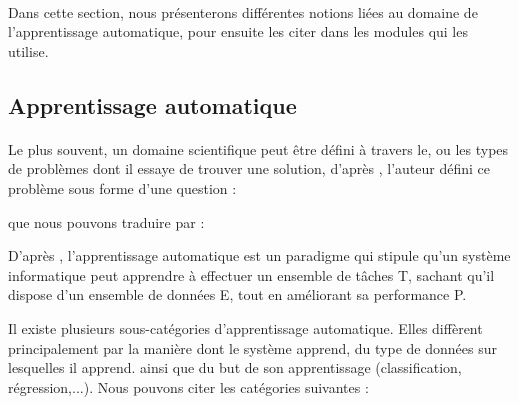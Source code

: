 	\paragraph{}
	Dans cette section, nous présenterons différentes notions liées au domaine de l'apprentissage automatique, pour ensuite les citer dans les modules qui les utilise. 
	\subsection{Apprentissage automatique}
		\paragraph{}
		Le plus souvent, un domaine scientifique peut être défini à travers le, ou les types de problèmes dont il essaye de trouver une solution, d'après \cite{mitchelllearning}, l'auteur défini ce problème sous forme d'une question :
		\begin{quote}
			\cite{mitchelllearning}
		\end{quote}
		que nous pouvons traduire par :
		\begin{quote}
		\end{quote}
		\par 
		D'après \cite{mitchelllearning}, l'apprentissage automatique est un paradigme qui stipule qu'un système informatique peut apprendre à effectuer un ensemble de tâches T, sachant qu'il dispose d'un ensemble de données E, tout en améliorant sa performance P.
		\par
		Il existe plusieurs sous-catégories d'apprentissage automatique. Elles diffèrent principalement par la manière dont le système apprend, du type de données sur lesquelles il apprend. ainsi que du but de son apprentissage (classification, régression,...). Nous pouvons citer les catégories suivantes :
